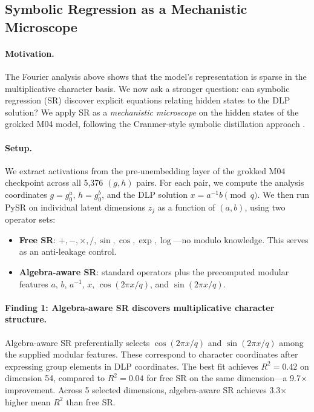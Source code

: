 \documentclass[twoside,11pt]{article}
\begin{document}
\subsection{Symbolic Regression as a Mechanistic Microscope}
\label{sec:symbolic}

\paragraph{Motivation.}
The Fourier analysis above shows that the model's representation is sparse in the multiplicative character basis. We now ask a stronger question: can symbolic regression (SR) discover explicit equations relating hidden states to the DLP solution? We apply SR as a \emph{mechanistic microscope} on the hidden states of the grokked M04 model, following the Cranmer-style symbolic distillation approach \citep{cranmer2020discovering}.

\paragraph{Setup.}
We extract activations from the pre-unembedding layer of the grokked M04 checkpoint across all 5,376 $(g, h)$ pairs. For each pair, we compute the analysis coordinates $g = g_0^a$, $h = g_0^b$, and the DLP solution $x = a^{-1} b \pmod{q}$. We then run PySR \citep{cranmer2023interpretable} on individual latent dimensions $z_j$ as a function of $(a, b)$, using two operator sets:
\begin{itemize}[leftmargin=*]
    \item \textbf{Free SR}: $+, -, \times, /, \sin, \cos, \exp, \log$---no modulo knowledge. This serves as an anti-leakage control.
    \item \textbf{Algebra-aware SR}: standard operators plus the precomputed modular features $a$, $b$, $a^{-1}$, $x$, $\cos(2\pi x/q)$, and $\sin(2\pi x/q)$.
\end{itemize}

\paragraph{Finding 1: Algebra-aware SR discovers multiplicative character structure.}
Algebra-aware SR preferentially selects $\cos(2\pi x/q)$ and $\sin(2\pi x/q)$ among the supplied modular features. These correspond to character coordinates after expressing group elements in DLP coordinates. The best fit achieves $R^2 = 0.42$ on dimension 54, compared to $R^2 = 0.04$ for free SR on the same dimension---a 9.7$\times$ improvement. Across 5 selected dimensions, algebra-aware SR achieves 3.3$\times$ higher mean $R^2$ than free SR.
\end{document}
